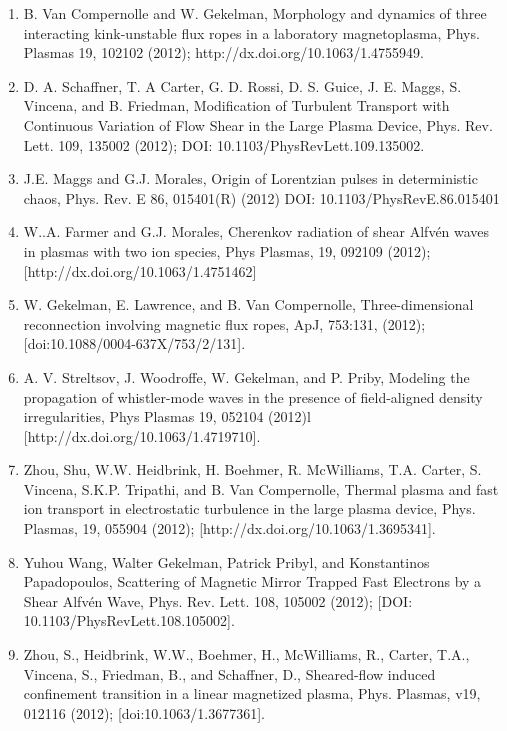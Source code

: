 \documentclass[11pt]{article}
\begin{document}
\begin{enumerate}
\item B. Van Compernolle and W. Gekelman, Morphology and dynamics of three interacting kink-unstable flux ropes in a laboratory magnetoplasma, Phys. Plasmas 19, 102102 (2012); http://dx.doi.org/10.1063/1.4755949.

\item D. A. Schaffner, T. A Carter, G. D. Rossi, D. S. Guice, J. E. Maggs, S. Vincena, and B. Friedman, Modification of Turbulent Transport with Continuous Variation of Flow Shear in the Large Plasma Device, Phys. Rev. Lett. 109, 135002 (2012); DOI: 10.1103/PhysRevLett.109.135002.

\item J.E. Maggs and G.J. Morales, Origin of Lorentzian pulses in deterministic chaos, Phys. Rev. E 86, 015401(R) (2012) DOI: 10.1103/PhysRevE.86.015401

\item  W..A. Farmer and G.J. Morales, Cherenkov radiation of shear Alfv\'{e}n waves in plasmas with two ion species, Phys Plasmas, 19, 092109 (2012); [http://dx.doi.org/10.1063/1.4751462]

\item  W. Gekelman, E. Lawrence, and B. Van Compernolle, Three-dimensional reconnection involving magnetic flux ropes, ApJ, 753:131, (2012); [doi:10.1088/0004-637X/753/2/131].

\item  A. V. Streltsov, J. Woodroffe, W. Gekelman, and P. Priby, Modeling the propagation of whistler-mode waves in the presence of field-aligned density irregularities, Phys Plasmas 19, 052104 (2012)l [http://dx.doi.org/10.1063/1.4719710].

\item  Zhou, Shu, W.W. Heidbrink, H. Boehmer, R. McWilliams, T.A. Carter, S. Vincena, S.K.P. Tripathi, and B. Van Compernolle, Thermal plasma and fast ion transport in electrostatic turbulence in the large plasma device, Phys. Plasmas, 19, 055904 (2012); [http://dx.doi.org/10.1063/1.3695341].

\item  Yuhou Wang, Walter Gekelman, Patrick Pribyl, and Konstantinos Papadopoulos, Scattering of Magnetic Mirror Trapped Fast Electrons by a Shear Alfv\'{e}n Wave, Phys. Rev. Lett. 108, 105002 (2012); [DOI: 10.1103/PhysRevLett.108.105002].

\item   Zhou, S., Heidbrink, W.W., Boehmer, H., McWilliams, R., Carter, T.A., Vincena, S., Friedman, B., and Schaffner, D., Sheared-flow induced confinement transition in a linear magnetized plasma, Phys. Plasmas, v19, 012116 (2012); [doi:10.1063/1.3677361].


\end{enumerate}
\end{document}
